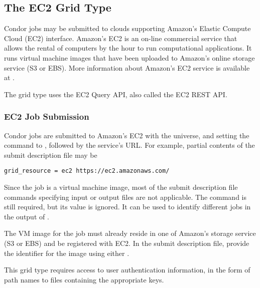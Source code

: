 \subsection{\label{sec:Amazon}The EC2 Grid Type }

Condor jobs may be submitted to clouds supporting
Amazon's Elastic Compute Cloud (EC2) interface.
Amazon's EC2 is an on-line commercial service that allows 
the rental of computers by the hour to run computational applications.
It runs virtual machine images that have been uploaded to Amazon's
online storage service (S3 or EBS).
More information about Amazon's EC2 service is available at
.

The  grid type uses the EC2 Query API,
also called the EC2 REST API.

\subsubsection{\label{sec:Amazon-submit}EC2 Job Submission}

Condor jobs are submitted to Amazon's EC2
with the  universe, and setting the
 command to , followed 
by the service's URL. For example,
partial contents of the submit description file may be
\begin{verbatim}
grid_resource = ec2 https://ec2.amazonaws.com/
\end{verbatim}

Since the job is a virtual machine image,
most of the submit description file commands
specifying input or output files are not applicable.
The  command is still required,
but its value is ignored. 
It can be used to identify different jobs in the output of .

The VM image for the job must already reside in one of Amazon's storage
service (S3 or EBS) and be registered with EC2.
In the submit description file,
provide the identifier for the image using either .

This grid type requires access to user authentication information,
in the form of path names to files containing the appropriate keys.

